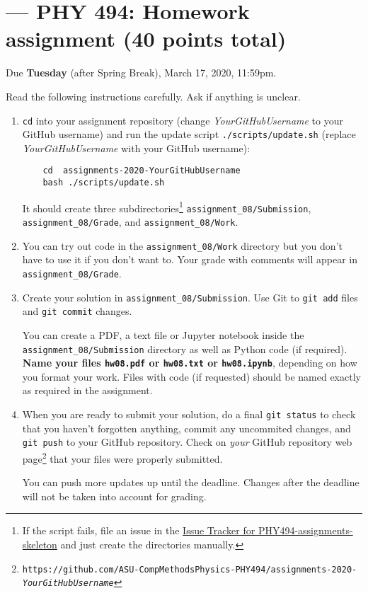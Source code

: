 \documentclass[letterpaper]{scrartcl}
\newcommand{\anumber}{8}
\newcommand{\anum}{0\anumber}
\begin{document}

\setcounter{section}{\anumber}
\addtocounter{section}{-1}
\section{ --- PHY 494: Homework assignment (40 points total)}

\noindent Due \textbf{Tuesday} (after Spring Break), March 17, 2020, 11:59pm.

\noindent
Read the following instructions carefully. Ask if anything is unclear.
\begin{enumerate}
\item \texttt{cd} into your assignment repository (change
  \emph{YourGitHubUsername} to your GitHub username) and run the
  update script \texttt{./scripts/update.sh} (replace
  \emph{YourGitHubUsername} with your GitHub username):
  \begin{verbatim}
    cd  assignments-2020-YourGitHubUsername
    bash ./scripts/update.sh
  \end{verbatim}
  It should create three subdirectories\footnote{If the script fails,
    file an issue in the
    \href{https://github.com/ASU-CompMethodsPhysics-PHY494/PHY494-assignments-skeleton/issues}{Issue
      Tracker for PHY494-assignments-skeleton} and just create the
    directories manually.} \texttt{assignment\_\anum/Submission},
  \texttt{assignment\_\anum/Grade}, and
  \texttt{assignment\_\anum/Work}.
\item You can try out code in the \texttt{assignment\_\anum/Work}
  directory but you don't have to use it if you don't want to. Your
  grade with comments will appear in
  \texttt{assignment\_\anum/Grade}.
\item Create your solution in
  \texttt{assignment\_\anum/Submission}. Use Git to \texttt{git
    add} files and \texttt{git commit} changes.

  You can create a PDF, a text file or Jupyter notebook inside the
  \texttt{assignment\_\anum/Submission} directory as well as Python
  code (if required). \textbf{Name your files \texttt{hw\anum.pdf} or
    \texttt{hw\anum.txt} or \texttt{hw\anum.ipynb}}, depending on how
  you format your work. Files with code (if requested) should be named
  exactly as required in the assignment.
\item When you are ready to submit your solution, do a final
  \texttt{git status} to check that you haven't forgotten anything,
  commit any uncommited changes, and \texttt{git push} to your GitHub
  repository. Check on \emph{your} GitHub repository web
  page\footnote{\texttt{https://github.com/ASU-CompMethodsPhysics-PHY494/assignments-2020-\emph{YourGitHubUsername}}}
  that your files were properly submitted.

  You can push more updates up until the deadline. Changes after the
  deadline will not be taken into account for grading.
\end{enumerate}
\end{document}
